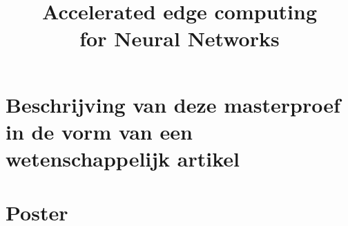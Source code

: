 \documentclass[11pt,a4paper,twoside,openright]{report}
\title{Accelerated edge computing\\ for Neural Networks}
\begin{document}

\preface











\appendix


\chapter{Beschrijving van deze masterproef in de vorm van een wetenschappelijk artikel}
%

\chapter{Poster}



\end{document}
